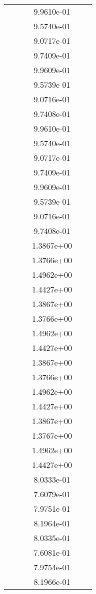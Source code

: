 \begin{xltabular}{\textwidth}{r|rS[table-format=1.3e+2]S[table-format=1.4e+2]S[table-format=1.4e+2]S[table-format=-1.5]}
&  &  & 9.9610e-01 & & \\
&  &  & 9.5740e-01 & & \\
&  &  & 9.0717e-01 & & \\
&  &  & 9.7409e-01 & & \\
&  &  & 9.9609e-01 & & \\
&  &  & 9.5739e-01 & & \\
&  &  & 9.0716e-01 & & \\
&  &  & 9.7408e-01 & & \\
&  &  & 9.9610e-01 & & \\
&  &  & 9.5740e-01 & & \\
&  &  & 9.0717e-01 & & \\
&  &  & 9.7409e-01 & & \\
&  &  & 9.9609e-01 & & \\
&  &  & 9.5739e-01 & & \\
&  &  & 9.0716e-01 & & \\
&  &  & 9.7408e-01 & & \\
&  &  & 1.3867e+00 & & \\
&  &  & 1.3766e+00 & & \\
&  &  & 1.4962e+00 & & \\
&  &  & 1.4427e+00 & & \\
&  &  & 1.3867e+00 & & \\
&  &  & 1.3766e+00 & & \\
&  &  & 1.4962e+00 & & \\
&  &  & 1.4427e+00 & & \\
&  &  & 1.3867e+00 & & \\
&  &  & 1.3766e+00 & & \\
&  &  & 1.4962e+00 & & \\
&  &  & 1.4427e+00 & & \\
&  &  & 1.3867e+00 & & \\
&  &  & 1.3767e+00 & & \\
&  &  & 1.4962e+00 & & \\
&  &  & 1.4427e+00 & & \\
&  &  & 8.0333e-01 & & \\
&  &  & 7.6079e-01 & & \\
&  &  & 7.9751e-01 & & \\
&  &  & 8.1964e-01 & & \\
&  &  & 8.0335e-01 & & \\
&  &  & 7.6081e-01 & & \\
&  &  & 7.9754e-01 & & \\
&  &  & 8.1966e-01 & & \\

\end{xltabular}
